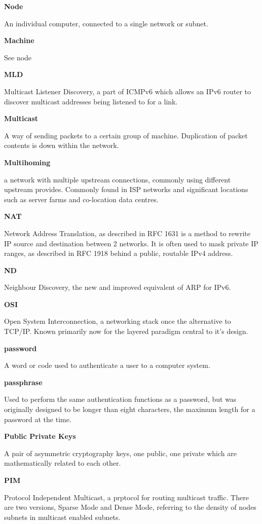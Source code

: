 \textbf{Node}

An individual computer, connected to a single network or subnet.

\textbf{Machine}

See node

\textbf{MLD}

Multicast Listener Discovery, a part of ICMPv6 which allows an IPv6
router to discover multicast addresses being listened to for a link.

\textbf{Multicast}

A way of sending packets to a certain group of machine. Duplication of
packet contents is down within the network.

\textbf{Multihoming}

a network with multiple upstream connections, commonly using different
upstream provides. Commonly found in ISP networks and significant
locations such as server farms and co-location data centres.

\textbf{NAT}

Network Address Translation, as described in RFC 1631 is a method
to rewrite IP source and destination between 2 networks. It is often
used to mask private IP ranges, as described in RFC 1918 behind a 
public, routable IPv4 address. 

\textbf{ND}

Neighbour Discovery, the new and improved equivalent of ARP for IPv6.

\textbf{OSI}

Open System Interconnection, a networking stack once the alternative to
TCP/IP. Known primarily now for the layered paradigm central to it's
design.

\textbf{password}

A word or code used to authenticate a user to a computer system.

\textbf{passphrase}

Used to perform the same authentication functions as a password, but was
originally designed to be longer than eight characters, the maximum
length for a password at the time.

\textbf{Public Private Keys}

A pair of asymmetric cryptography keys, one public, one private which 
are mathematically related to each other. 

\textbf{PIM}

Protocol Independent Multicast, a prptocol for routing multicast
traffic. There are two versions, Sparse Mode and Dense Mode, referring
to the density of nodes subnets in multicast enabled subnets.

